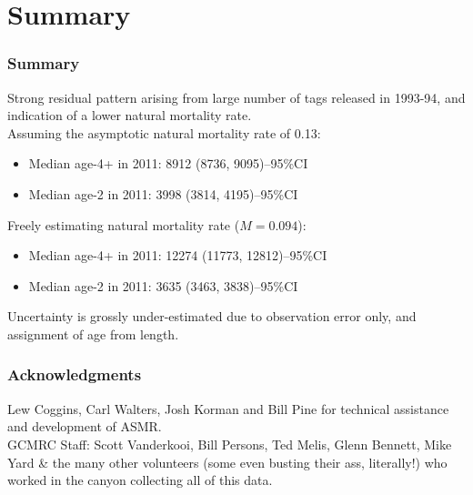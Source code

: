 \documentclass{beamer}
\begin{document}
\section{Summary} %
\label{sec:summary}
\begin{frame}[t]\frametitle{Summary}
	Strong residual pattern arising from large number of tags released in 1993-94, and indication of a lower natural mortality rate.\\
	\pause \medskip
	Assuming the asymptotic natural mortality rate of 0.13:\\
	\begin{itemize}
		\item     Median age-4+ in 2011: 8912  (8736, 9095)--95\%CI
		\item     Median age-2 in 2011: 3998  (3814, 4195)--95\%CI
	\end{itemize}
	\pause \medskip
	Freely estimating natural mortality rate ($M=0.094$):\\
	\begin{itemize}
		\item     Median age-4+ in 2011: 12274 (11773, 12812)--95\%CI
		\item     Median age-2 in 2011: 3635  (3463, 3838)--95\%CI
	\end{itemize}
	\pause \medskip
	Uncertainty is grossly under-estimated due to observation error only, and assignment of age from length.
\end{frame}
%
\begin{frame}[t]\frametitle{Acknowledgments}
	\vfill
	Lew Coggins, Carl Walters, Josh Korman and Bill Pine for technical assistance and development of ASMR.\\
	\vfill
	GCMRC Staff: Scott Vanderkooi, Bill Persons, Ted Melis, Glenn Bennett, Mike Yard \& the many other volunteers (some even busting their ass, literally!) who worked in the canyon collecting all of this data.
\end{frame}
\end{document}
